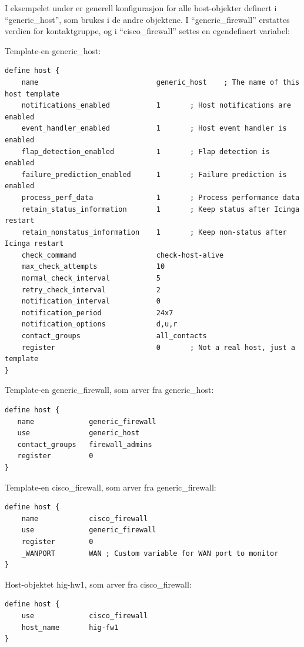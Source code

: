 I eksempelet under er generell konfigurasjon for alle host-objekter definert i ``generic\_host'', som brukes i de andre objektene. I ``generic\_firewall'' erstattes verdien for kontaktgruppe, og i ``cisco\_firewall'' settes en egendefinert variabel:

Template-en generic\_host: 
\begin{lstlisting}[style=example]
define host {
    name                            generic_host    ; The name of this host template
    notifications_enabled           1       ; Host notifications are enabled
    event_handler_enabled           1       ; Host event handler is enabled
    flap_detection_enabled          1       ; Flap detection is enabled
    failure_prediction_enabled      1       ; Failure prediction is enabled
    process_perf_data               1       ; Process performance data
    retain_status_information       1       ; Keep status after Icinga restart
    retain_nonstatus_information    1       ; Keep non-status after Icinga restart
    check_command                   check-host-alive
    max_check_attempts              10
    normal_check_interval           5
    retry_check_interval            2
    notification_interval           0
    notification_period             24x7
    notification_options            d,u,r
    contact_groups                  all_contacts
    register                        0       ; Not a real host, just a template
}
\end{lstlisting}

Template-en generic\_firewall, som arver fra generic\_host:
\begin{lstlisting}[style=example]
define host {
   name             generic_firewall
   use              generic_host
   contact_groups   firewall_admins
   register         0
}
\end{lstlisting}

Template-en cisco\_firewall, som arver fra generic\_firewall:
\begin{lstlisting}[style=example]
define host {
    name            cisco_firewall
    use             generic_firewall
    register        0
    _WANPORT        WAN ; Custom variable for WAN port to monitor
}
\end{lstlisting}

Host-objektet hig-hw1, som arver fra cisco\_firewall:
\begin{lstlisting}[style=example]
define host {
    use             cisco_firewall
    host_name       hig-fw1
}
\end{lstlisting}

